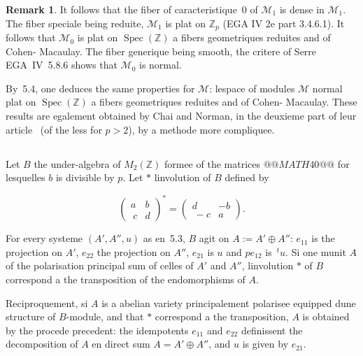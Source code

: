 \documentclass[11pt,a4paper]{article}
\theoremstyle{plain}
\theoremstyle{definition}
\newtheorem{remark}[theorem]{Remark}
\DeclareMathOperator{\Spec}{Spec}
\begin{document}
\begin{remark}
It follows that the fiber of caracteristique~0 of $\mathscr{M}_1$ is dense in $\mathscr{M}_1$. The fiber
speciale being reduite, $\mathscr{M}_1$ is plat on $\mathbb{Z}_p$ (EGA IV 2e part 3.4.6.1). It follows
that $\mathscr{M}_0$ is plat on $\Spec(\mathbb{Z})$ a fibers geometriques reduites and of Cohen-
Macaulay. The fiber generique being smooth, the critere of Serre EGA~IV~5.8.6
shows that $\mathscr{M}_0$ is normal.

By~5.4, one deduces the same properties for $\mathscr{M}$: lespace of modules $\mathscr{M}$
normal plat on $\Spec(\mathbb{Z})$ a fibers geometriques reduites and of Cohen-
Macaulay. These results are egalement obtained by Chai and Norman, in the
deuxieme part of leur article~\cite{ChaiNorman} (of the less for $p > 2$), by a methode
more compliquee.
\end{remark}

\subsection{}

Let $B$ the under-algebra of $M_2(\mathbb{Z})$ formee of the matrices $@@MATH40@@$ for lesquelles
$b$ is divisible by $p$. Let $*$ linvolution of $B$ defined by

\begin{equation}
\begin{pmatrix} a & b \\\ c & d \end{pmatrix}^* = \begin{pmatrix} d & -b \\\ -c & a \end{pmatrix}.
\end{equation}

For every systeme $(A', A'', u)$ as en~5.3, $B$ agit on $A := A' \oplus A''$: $e_{11}$ is the
projection on $A'$, $e_{22}$ the projection on $A''$, $e_{21}$ is $u$ and $pe_{12}$ is $\,\!^t u$. Si one munit
$A$ of the polarisation principal sum of celles of $A'$ and $A''$, linvolution $*$ of
$B$ correspond a the transposition of the endomorphisms of $A$.

Reciproquement, si $A$ is a abelian variety principalement polarisee
equipped dune structure of $B$-module, and that $*$ correspond a the transposition, $A$
is obtained by the procede precedent: the idempotents $e_{11}$ and $e_{22}$ definissent the
decomposition of $A$ en direct sum $A = A' \oplus A''$, and $u$ is given by $e_{21}$.

\subsection{}
\end{document}

